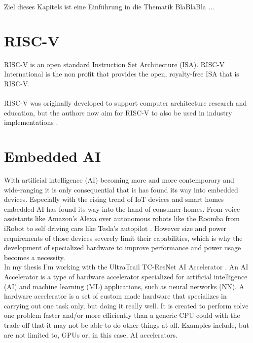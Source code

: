 
Ziel dieses Kapitels ist eine Einführung in die Thematik BlaBlaBla ...

\section{RISC-V}

RISC-V \cite{riscv} is an open standard Instruction Set Architecture (ISA).
RISC-V International is the non profit that provides the open, royalty-free ISA that is RISC-V.
\\\\
RISC-V was originally developed to support computer architecture research and education, but the authors now
aim for RISC-V to also be used in industry implementations \cite{riscv_spec}.

\section{Embedded AI}

With artificial intelligence (AI) becoming more and more contemporary and wide-ranging it is only consequential that is has found its way into embedded devices.
Especially with the  rising trend of IoT devices and smart homes
embedded AI has found its way into the hand of consumer homes.
From voice assistants like Amazon's Alexa \cite{alexa} over autonomous robots like the Roomba \cite{roomba} from iRobot to self driving cars like Tesla's autopilot \cite{autopilot} .
However size and power requirements of those devices severely limit their capabilities, which is why the development of specialized hardware to improve performance
and power usage becomes a necessity.\\
In my thesis I'm working with the UltraTrail TC-ResNet AI Accelerator \cite{ultratrail}.
An AI Accelerator is a type of hardware accelerator specialized for artificial intelligence (AI) and machine learning (ML) applications, such as neural networks (NN).
A hardware accelerator is a set of custom made hardware that specializes in carrying out one task only, but doing it really well.
It is created to perform solve one problem faster and/or more efficiently than a generic CPU could with the trade-off that it may not be able to do other things at all.
Examples include, but are not limited to, GPUs or, in this case, AI accelerators.\\\\


